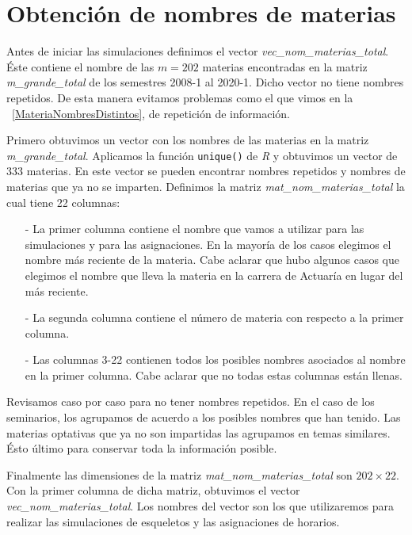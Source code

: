 \section{Obtención de nombres de materias}

Antes de iniciar las simulaciones definimos el vector \textit{vec\_nom\_materias\_total}. Éste contiene el nombre de las $m = 202$ materias encontradas en la matriz \textit{m\_grande\_total} de los semestres 2008-1 al 2020-1. Dicho vector  no tiene nombres repetidos. De esta manera evitamos problemas como el que vimos en la \figurename{~\ref{MateriaNombresDistintos}}, de repetición de información.

Primero obtuvimos un vector con los nombres de las materias en la matriz \textit{m\_grande\_total}. Aplicamos la función \verb+unique()+ de \textit{R} y obtuvimos un vector de 333 materias. En este vector se pueden encontrar nombres repetidos y nombres de materias que ya no se imparten. Definimos la matriz \textit{mat\_nom\_materias\_total} la cual tiene 22 columnas:

\begin{itemize}
\item[-] La primer columna contiene el nombre que vamos a utilizar para las simulaciones y para las asignaciones. En la mayoría de los casos elegimos el nombre más reciente de la materia. Cabe aclarar que hubo algunos casos que elegimos el nombre que lleva la materia en la carrera de Actuaría en lugar del más reciente.

\item[-] La segunda columna contiene el número de materia con respecto a la primer columna.

\item[-] Las columnas 3-22 contienen todos los posibles nombres asociados al nombre en la primer columna. Cabe aclarar que no todas estas columnas están llenas.
\end{itemize}

Revisamos caso por caso para no tener nombres repetidos. En el caso de los seminarios, los agrupamos de acuerdo a los posibles nombres que han tenido. Las materias optativas que ya no son impartidas las agrupamos en temas similares. Ésto último para conservar toda la información posible. %

Finalmente las dimensiones de la matriz \textit{mat\_nom\_materias\_total} son $202 \times 22$. Con la primer columna de dicha matriz, obtuvimos el vector \textit{vec\_nom\_materias\_total}. Los nombres del vector son los que utilizaremos para realizar las simulaciones de esqueletos y las asignaciones de horarios.
